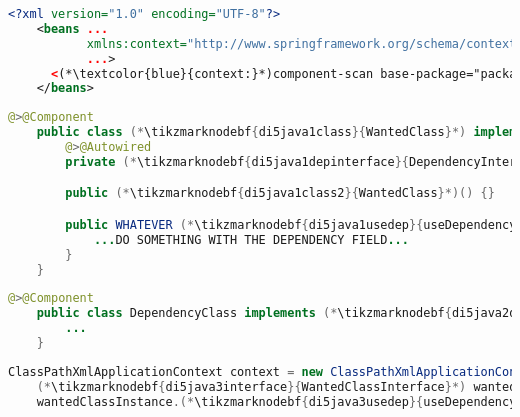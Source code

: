 \newline\example
\begin{lstlisting}[language=XML, title={Configuration XML}]
    <?xml version="1.0" encoding="UTF-8"?>
    <beans ...
           xmlns:context="http://www.springframework.org/schema/context"
           ...>
      <(*\textcolor{blue}{context:}*)component-scan base-package="package.subfolder"/>
    </beans>
\end{lstlisting}
\begin{lstlisting}[language=Java, title={Wanted class with the zero--parameter constructor}]
    @>@Component
    public class (*\tikzmarknodebf{di5java1class}{WantedClass}*) implements (*\tikzmarknodebf{di5java1interface}{WantedClassInterface}*) {
        @>@Autowired
        private (*\tikzmarknodebf{di5java1depinterface}{DependencyInterface}*) dependencyField;

        public (*\tikzmarknodebf{di5java1class2}{WantedClass}*)() {}

        public WHATEVER (*\tikzmarknodebf{di5java1usedep}{useDependency}*)() {
            ...DO SOMETHING WITH THE DEPENDENCY FIELD...
        }
    }
\end{lstlisting}
\begin{lstlisting}[language=Java, title={Dependency class}]
    @>@Component
    public class DependencyClass implements (*\tikzmarknodebf{di5java2depinterface}{DependencyInterface}*) {
        ...
    }
\end{lstlisting}
\begin{lstlisting}[language=Java, title={Usage}]
    ClassPathXmlApplicationContext context = new ClassPathXmlApplicationContext("configurationFile.xml");
    (*\tikzmarknodebf{di5java3interface}{WantedClassInterface}*) wantedClassInstance = context.getBean("(*\tikzmarknodebf{di5java3beanid}{wantedClass}[ForestGreen]*)", (*\tikzmarknodebf{di5java3interface2}{WantedClassInterface}*).class);
    wantedClassInstance.(*\tikzmarknodebf{di5java3usedep}{useDependency}*)();
\end{lstlisting}
\newpage

